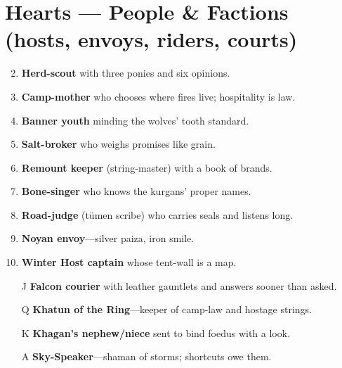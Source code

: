 \section*{\textbf{Hearts} --- People \& Factions (hosts, envoys, riders, courts)}
\begin{enumerate}
\setcounter{enumi}{1}
\item \textbf{Herd-scout} with three ponies and six opinions.
\item \textbf{Camp-mother} who chooses where fires live; hospitality is law.
\item \textbf{Banner youth} minding the wolves' tooth standard.
\item \textbf{Salt-broker} who weighs promises like grain.
\item \textbf{Remount keeper} (string-master) with a book of brands.
\item \textbf{Bone-singer} who knows the kurgans' proper names.
\item \textbf{Road-judge} (tümen scribe) who carries seals and listens long.
\item \textbf{Noyan envoy}---silver paiza, iron smile.
\item \textbf{Winter Host captain} whose tent-wall is a map.
\item[J] \textbf{Falcon courier} with leather gauntlets and answers sooner than asked.
\item[Q] \textbf{Khatun of the Ring}---keeper of camp-law and hostage strings.
\item[K] \textbf{Khagan's nephew/niece} sent to bind foedus with a look.
\item[A] \textbf{Sky-Speaker}---shaman of storms; shortcuts owe them.
\end{enumerate}

